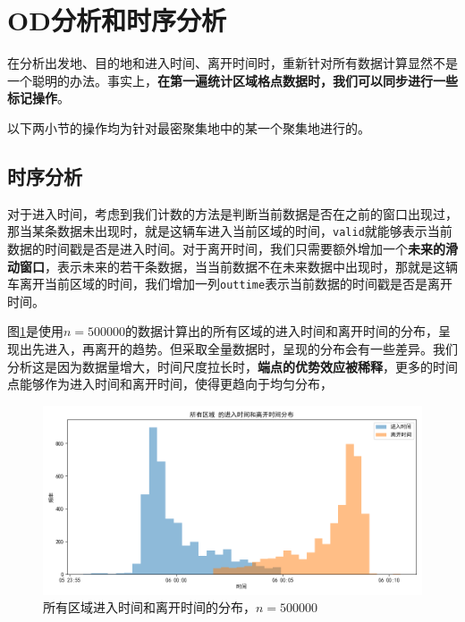 \documentclass[UTF8]{ctexart}
\begin{document}
\section{OD分析和时序分析}

在分析出发地、目的地和进入时间、离开时间时，重新针对所有数据计算显然不是一个聪明的办法。事实上，\textbf{在第一遍统计区域格点数据时，我们可以同步进行一些标记操作}。

以下两小节的操作均为针对最密聚集地中的某一个聚集地进行的。

\subsection{时序分析}

对于进入时间，考虑到我们计数的方法是判断当前数据是否在之前的窗口出现过，那当某条数据未出现时，就是这辆车进入当前区域的时间，\texttt{valid}就能够表示当前数据的时间戳是否是进入时间。对于离开时间，我们只需要额外增加一个\textbf{未来的滑动窗口}，表示未来的若干条数据，当当前数据不在未来数据中出现时，那就是这辆车离开当前区域的时间，我们增加一列\texttt{outtime}表示当前数据的时间戳是否是离开时间。

图\ref{50}是使用$n=500000$的数据计算出的所有区域的进入时间和离开时间的分布，呈现出先进入，再离开的趋势。但采取全量数据时，呈现的分布会有一些差异。我们分析这是因为数据量增大，时间尺度拉长时，\textbf{端点的优势效应被稀释}，更多的时间点能够作为进入时间和离开时间，使得更趋向于均匀分布，

\begin{figure}[htb]
    \centering
    \includegraphics[width = \textwidth]{../img/时序分布/50万所有区域时间分布.png}
    \caption{所有区域进入时间和离开时间的分布，$n=500000$}
    \label{50}    
\end{figure}
\end{document}
